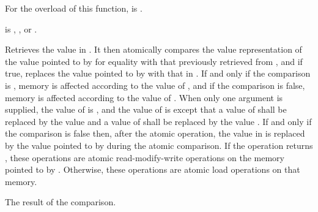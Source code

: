\begin{itemdescr}
\pnum
\constraints
For the  overload of this function,
 is .

\pnum
\expects
{} is
,
, or
.

\pnum
\effects
Retrieves the value in . It then atomically
compares the value representation of the value pointed to by 
for equality with that previously retrieved from ,
and if true, replaces the value pointed to
by  with that in .
If and only if the comparison is , memory is affected according to the
value of , and if the comparison is false, memory is affected according
to the value of . When only one  argument is
supplied, the value of  is , and the value of
 is  except that a value of 
shall be replaced by the value  and a value of
 shall be replaced by the value
.
If and only if the comparison is false then, after the atomic operation,
the value in  is replaced by the value
pointed to by  during the atomic comparison.
If the operation returns , these
operations are atomic read-modify-write
operations on the memory
pointed to by .
Otherwise, these operations are atomic load operations on that memory.

\pnum
\returns
The result of the comparison.


\end{itemdescr}
